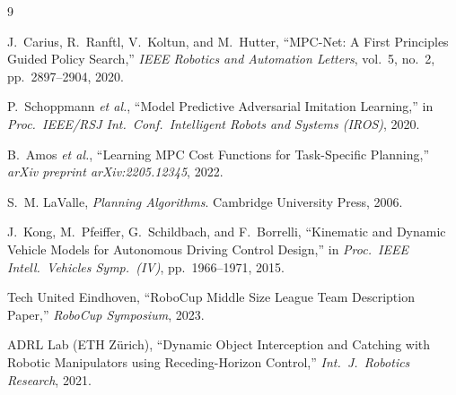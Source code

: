 \documentclass[10pt,twocolumn,letterpaper]{article}
\begin{document}

\begin{thebibliography}{9}

J.~Carius, R.~Ranftl, V.~Koltun, and M.~Hutter,
``MPC-Net: A First Principles Guided Policy Search,''
\textit{IEEE Robotics and Automation Letters},
vol.~5, no.~2, pp.~2897--2904, 2020.

P.~Schoppmann \textit{et al.},
``Model Predictive Adversarial Imitation Learning,''
in \textit{Proc.\ IEEE/RSJ Int.\ Conf.\ Intelligent Robots and
Systems (IROS)}, 2020.

B.~Amos \textit{et al.},
``Learning MPC Cost Functions for Task-Specific Planning,''
\textit{arXiv preprint arXiv:2205.12345}, 2022.

S.~M. LaValle,
\textit{Planning Algorithms}.
Cambridge University Press, 2006.

J.~Kong, M.~Pfeiffer, G.~Schildbach, and F.~Borrelli,
``Kinematic and Dynamic Vehicle Models for Autonomous Driving
Control Design,''
in \textit{Proc.\ IEEE Intell.\ Vehicles Symp.\ (IV)},
pp.~1966--1971, 2015.

Tech United Eindhoven,
``RoboCup Middle Size League Team Description Paper,''
\textit{RoboCup Symposium}, 2023.

ADRL Lab (ETH Z\"urich),
``Dynamic Object Interception and Catching with Robotic Manipulators
using Receding-Horizon Control,''
\textit{Int.\ J.\ Robotics Research}, 2021.

\end{thebibliography}
\end{document}
